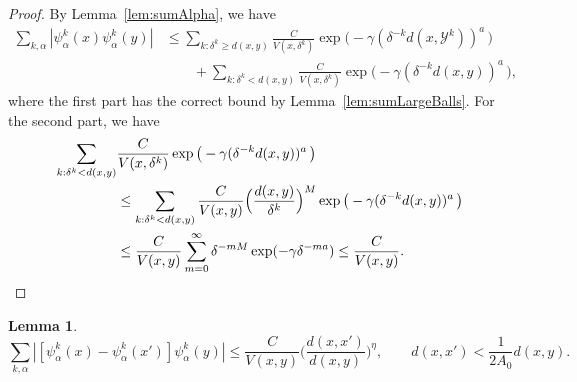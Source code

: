 \documentclass{amsart}
\numberwithin{equation}{section}
\theoremstyle{plain}
\newtheorem{lemma}[equation]{Lemma}
\theoremstyle{definition}
\theoremstyle{remark}
\begin{document}
{{{\begin{proof}
By Lemma~\ref{lem:sumAlpha}, we have
\begin{equation*}
\begin{split}
   \sum_{k,\alpha}{|{\psi^k_\alpha(x)\psi^k_\alpha(y)}|}
   &\leq\sum_{k:\delta^k\geq d(x,y)}\frac{C}{V(x,\delta^k)}\exp\big(-\gamma (\delta ^{-k}{d(x,\mathscr{Y}^k)})^a \, \big) \\
   &\qquad+\sum_{k:\delta^k<d(x,y)}\frac{C}{V(x,\delta^k)}\exp\big(-\gamma (\delta ^{-k}{d(x,y)})^a \, \big),
\end{split}
\end{equation*}
where the first part has the correct bound by Lemma~\ref{lem:sumLargeBalls}. For the second part, we have
\begin{equation*}
\begin{split}
  \sum_{k:\delta^k<d(x,y)} &\frac{C}{V(x,\delta^k)}\exp\big(-\gamma (\delta ^{-k}{d(x,y)})^a \, \big) \\
  &\leq\sum_{k:\delta^k<d(x,y)}\frac{C}{V(x,y)}\Big(\frac{d(x,y)}{\delta^k}\Big)^M\exp\big(-\gamma (\delta ^{-k}{d(x,y)})^a \, \big) \\
  &\leq\frac{C}{V(x,y)}\sum_{m=0}^{\infty}\delta^{-mM}\exp(-\gamma\delta^{-ma})\leq\frac{C}{V(x,y)}.\qedhere
\end{split}
\end{equation*}
\end{proof}
 
 \begin{lemma}\label{lem:sumDifference}
\begin{equation*}
  \sum_{k,\alpha}{|{[\psi^k_\alpha(x)-\psi^k_\alpha(x')]\psi^k_\alpha(y)}|}
  \leq\frac{C}{V(x,y)}\Big(\frac{d(x,x')}{d(x,y)}\Big)^{\eta},\qquad
  d(x,x')<\frac{1}{2A_0}d(x,y).
\end{equation*}
\end{lemma}
 
}}}
\end{document}
